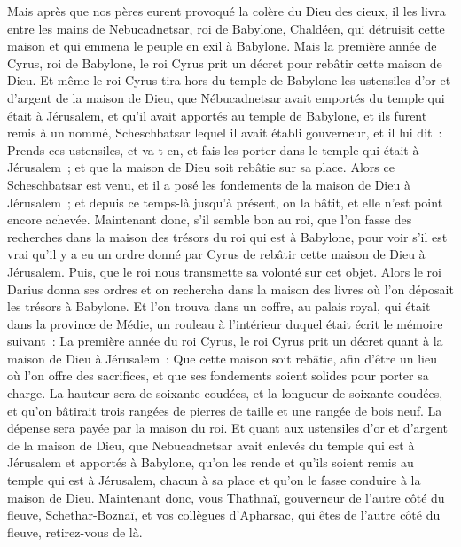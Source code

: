 \begin{multicols}{2}
Mais après que nos pères eurent provoqué la colère du Dieu des cieux, il les livra entre les mains de Nebucadnetsar, roi de Babylone, Chaldéen, qui détruisit cette maison et qui emmena le peuple en exil à Babylone.
Mais la première année de Cyrus, roi de Babylone, le roi Cyrus prit un décret pour rebâtir cette maison de Dieu.
Et même le roi Cyrus tira hors du temple de Babylone les ustensiles d'or et d'argent de la maison de Dieu, que Nébucadnetsar avait emportés du temple qui était à Jérusalem, et qu'il avait apportés au temple de Babylone, et ils furent remis à un nommé, Scheschbatsar lequel il avait établi gouverneur,
et il lui dit~: Prends ces ustensiles, et va-t-en, et fais les porter dans le temple qui était à Jérusalem~; et que la maison de Dieu soit rebâtie sur sa place.
Alors ce Scheschbatsar est venu, et il a posé les fondements de la maison de Dieu à Jérusalem~; et depuis ce temps-là jusqu'à présent, on la bâtit, et elle n'est point encore achevée.
Maintenant donc, s'il semble bon au roi, que l'on fasse des recherches dans la maison des trésors du roi qui est à Babylone, pour voir s'il est vrai qu'il y a eu un ordre donné par Cyrus de rebâtir cette maison de Dieu à Jérusalem. Puis, que le roi nous transmette sa volonté sur cet objet.
\VerseOne{}Alors le roi Darius donna ses ordres et on rechercha dans la maison des livres où l'on déposait les trésors à Babylone.
Et l'on trouva dans un coffre, au palais royal, qui était dans la province de Médie, un rouleau à l'intérieur duquel était écrit le mémoire suivant~:
La première année du roi Cyrus, le roi Cyrus prit un décret quant à la maison de Dieu à Jérusalem~: Que cette maison soit rebâtie, afin d'être un lieu où l'on offre des sacrifices, et que ses fondements soient solides pour porter sa charge. La hauteur sera de soixante coudées, et la longueur de soixante coudées,
et qu'on bâtirait trois rangées de pierres de taille et une rangée de bois neuf. La dépense sera payée par la maison du roi.
Et quant aux ustensiles d'or et d'argent de la maison de Dieu, que Nebucadnetsar avait enlevés du temple qui est à Jérusalem et apportés à Babylone, qu'on les rende et qu'ils soient remis au temple qui est à Jérusalem, chacun à sa place et qu'on le fasse conduire à la maison de Dieu.
Maintenant donc, vous Thathnaï, gouverneur de l'autre côté du fleuve, Schethar-Boznaï, et vos collègues d'Apharsac, qui êtes de l'autre côté du fleuve, retirez-vous de là.

\end{multicols}
